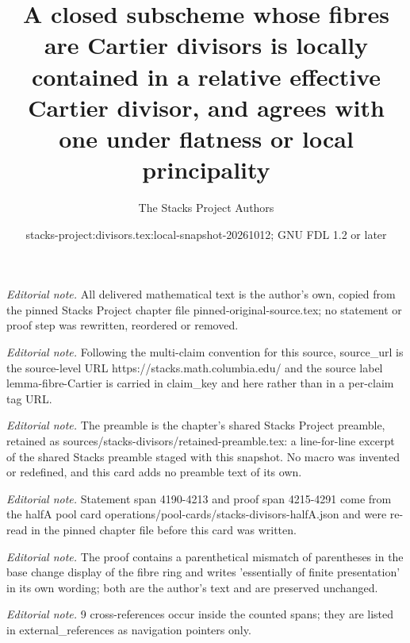 \documentclass[10pt,a4paper]{amsart}
\title{A closed subscheme whose fibres are Cartier divisors is locally contained in a relative effective Cartier divisor, and agrees with one under flatness or local principality}
\author{The Stacks Project Authors}
\date{stacks-project:divisors.tex:local-snapshot-20261012; GNU FDL 1.2 or later}
\theoremstyle{plain}
\theoremstyle{definition}
\theoremstyle{remark}
\numberwithin{equation}{subsection}
\begin{document}
\maketitle
\noindent\textit{Editorial note.} All delivered mathematical text is the author's own, copied from the pinned Stacks Project chapter file pinned-original-source.tex; no statement or proof step was rewritten, reordered or removed.\par\medskip
\noindent\textit{Editorial note.} Following the multi-claim convention for this source, source\_url is the source-level URL https://stacks.math.columbia.edu/ and the source label lemma-fibre-Cartier is carried in claim\_key and here rather than in a per-claim tag URL.\par\medskip
\noindent\textit{Editorial note.} The preamble is the chapter's shared Stacks Project preamble, retained as sources/stacks-divisors/retained-preamble.tex: a line-for-line excerpt of the shared Stacks preamble staged with this snapshot. No macro was invented or redefined, and this card adds no preamble text of its own.\par\medskip
\noindent\textit{Editorial note.} Statement span 4190-4213 and proof span 4215-4291 come from the halfA pool card operations/pool-cards/stacks-divisors-halfA.json and were re-read in the pinned chapter file before this card was written.\par\medskip
\noindent\textit{Editorial note.} The proof contains a parenthetical mismatch of parentheses in the base change display of the fibre ring and writes 'essentially of finite presentation' in its own wording; both are the author's text and are preserved unchanged.\par\medskip
\noindent\textit{Editorial note.} 9 cross-references occur inside the counted spans; they are listed in external\_references as navigation pointers only.\par\medskip
\end{document}
